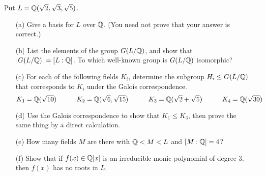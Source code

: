 \documentclass[a4paper]{article}
\begin{document}
\begin{problem}%
 Put $L={\mathbb{Q}}(\sqrt{2},\sqrt{3},\sqrt{5})$.
 \begin{itemize}
  \item[(a)] Give a basis for $L$ over ${\mathbb{Q}}$.  (You need not prove that
   your answer is correct.) 
  \item[(b)] List the elements of the group $G(L/{\mathbb{Q}})$, and show that
   $|G(L/{\mathbb{Q}})|=[L:{\mathbb{Q}}]$.  To which well-known group is $G(L/{\mathbb{Q}})$
   isomorphic? 
  \item[(c)] For each of the following fields $K_i$, determine the
   subgroup $H_i\leq G(L/{\mathbb{Q}})$ that corresponds to $K_i$ under the
   Galois correspondence.
   \[ K_1 = {\mathbb{Q}}(\sqrt{10}) \hspace{3em}
      K_2 = {\mathbb{Q}}(\sqrt{6},\sqrt{15}) \hspace{3em}
      K_3 = {\mathbb{Q}}(\sqrt{2}+\sqrt{5}) \hspace{3em}
      K_4 = {\mathbb{Q}}(\sqrt{30})
   \]
  \item[(d)] Use the Galois correspondence to show that $K_1\leq K_3$,
   then prove the same thing by a direct calculation. 
  \item[(e)] How many fields $M$ are there with ${\mathbb{Q}}<M<L$ and
   $[M:{\mathbb{Q}}]=4$? 
  \item[(f)] Show that if $f(x)\in{\mathbb{Q}}[x]$ is an irreducible monic
   polynomial of degree $3$, then $f(x)$ has no roots in $L$. 
 \end{itemize}
\end{problem}
\end{document}
